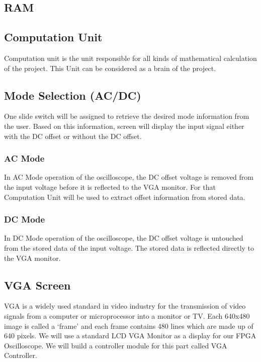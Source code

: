 \documentclass[paper]{IEEEtran}
\begin{document}
\subsection{RAM} \- \indent
	

\subsection{Computation Unit} \- \indent
	Computation unit is the unit responsible for all kinds of mathematical calculation of the project. This Unit can be considered as a brain of the project. 

\subsection{Mode Selection (AC/DC)} \- \indent
	One slide switch will be assigned to retrieve the desired mode information from the user. Based on this information, screen will display the input signal either with the DC offset or without the DC offset.

\subsubsection{AC Mode} \- \indent
	In AC Mode operation of the oscilloscope, the DC offset voltage is removed from the input voltage before it is reflected to the VGA monitor. For that Computation Unit will be used to extract offset information from stored data.

\subsubsection{DC Mode} \- \indent
	In DC Mode operation of the oscilloscope, the DC offset voltage is untouched from the stored data of the input voltage. The stored data is reflected directly to the VGA monitor. 
	

\subsection{VGA Screen} \- \indent
	VGA is a widely used standard in video industry for the transmission of video signals from a computer or microprocessor into a monitor or TV. Each 640x480 image is called a ‘frame’ and each frame contains 480 lines which are made up of 640 pixels. We will use a standard LCD VGA Monitor as a display for our FPGA Oscilloscope. We will build a controller module for this part called VGA Controller. 
	
\end{document}
